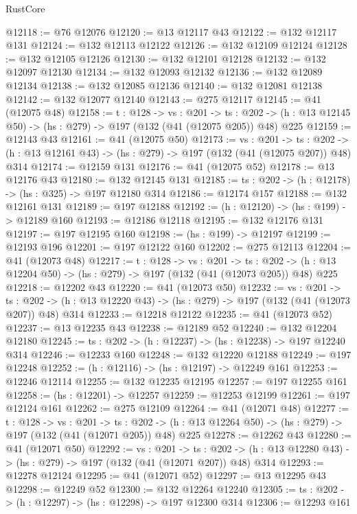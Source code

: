 \begin{lexlean}{RustCore}
\begin{coremodule}
@12118 := @76 @12076
@12120 := @13 @12117 @43
@12122 := @132 @12117 @131
@12124 := @132 @12113 @12122
@12126 := @132 @12109 @12124
@12128 := @132 @12105 @12126
@12130 := @132 @12101 @12128
@12132 := @132 @12097 @12130
@12134 := @132 @12093 @12132
@12136 := @132 @12089 @12134
@12138 := @132 @12085 @12136
@12140 := @132 @12081 @12138
@12142 := @132 @12077 @12140
@12143 := @275 @12117
@12145 := @41 (@12075 @48)
@12158 := {t : @128} ->
  {vs : @201} ->
  {ts : @202} -> (h : @13 @12145 @50) -> (hs : @279) -> @197 (@132 (@41 (@12075 @205)) @48) @225
@12159 := @12143 @43
@12161 := @41 (@12075 @50)
@12173 := {vs : @201} ->
  {ts : @202} -> (h : @13 @12161 @43) -> (hs : @279) -> @197 (@132 (@41 (@12075 @207)) @48) @314
@12174 := @12159 @131
@12176 := @41 (@12075 @52)
@12178 := @13 @12176 @43
@12180 := @132 @12145 @131
@12185 := {ts : @202} -> (h : @12178) -> (hs : @325) -> @197 @12180 @314
@12186 := @12174 @157
@12188 := @132 @12161 @131
@12189 := @197 @12188
@12192 := (h : @12120) -> (hs : @199) -> @12189 @160
@12193 := @12186 @12118
@12195 := @132 @12176 @131
@12197 := @197 @12195 @160
@12198 := (hs : @199) -> @12197
@12199 := @12193 @196
@12201 := @197 @12122 @160
@12202 := @275 @12113
@12204 := @41 (@12073 @48)
@12217 := {t : @128} ->
  {vs : @201} ->
  {ts : @202} -> (h : @13 @12204 @50) -> (hs : @279) -> @197 (@132 (@41 (@12073 @205)) @48) @225
@12218 := @12202 @43
@12220 := @41 (@12073 @50)
@12232 := {vs : @201} ->
  {ts : @202} -> (h : @13 @12220 @43) -> (hs : @279) -> @197 (@132 (@41 (@12073 @207)) @48) @314
@12233 := @12218 @12122
@12235 := @41 (@12073 @52)
@12237 := @13 @12235 @43
@12238 := @12189 @52
@12240 := @132 @12204 @12180
@12245 := {ts : @202} -> (h : @12237) -> (hs : @12238) -> @197 @12240 @314
@12246 := @12233 @160
@12248 := @132 @12220 @12188
@12249 := @197 @12248
@12252 := (h : @12116) -> (hs : @12197) -> @12249 @161
@12253 := @12246 @12114
@12255 := @132 @12235 @12195
@12257 := @197 @12255 @161
@12258 := (hs : @12201) -> @12257
@12259 := @12253 @12199
@12261 := @197 @12124 @161
@12262 := @275 @12109
@12264 := @41 (@12071 @48)
@12277 := {t : @128} ->
  {vs : @201} ->
  {ts : @202} -> (h : @13 @12264 @50) -> (hs : @279) -> @197 (@132 (@41 (@12071 @205)) @48) @225
@12278 := @12262 @43
@12280 := @41 (@12071 @50)
@12292 := {vs : @201} ->
  {ts : @202} -> (h : @13 @12280 @43) -> (hs : @279) -> @197 (@132 (@41 (@12071 @207)) @48) @314
@12293 := @12278 @12124
@12295 := @41 (@12071 @52)
@12297 := @13 @12295 @43
@12298 := @12249 @52
@12300 := @132 @12264 @12240
@12305 := {ts : @202} -> (h : @12297) -> (hs : @12298) -> @197 @12300 @314
@12306 := @12293 @161

\end{coremodule}
\end{lexlean}
